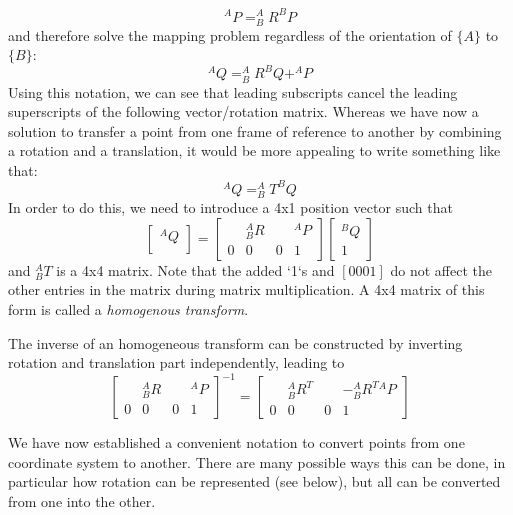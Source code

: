 \begin{equation}
^AP=^A_BR^BP
\end{equation}
%
and therefore solve the mapping problem regardless of the orientation of $\{A\}$ to $\{B\}$:
\begin{equation}
^AQ=^A_BR^BQ+^AP
\end{equation}
Using this notation, we can see that leading subscripts cancel the leading superscripts of the following vector/rotation matrix. Whereas we have now a solution to transfer a point from one frame of reference to another by combining a rotation and a translation, it would be more appealing to write something like that:
\begin{equation}
^AQ=^A_BT^BQ
\end{equation}
In order to do this, we need to introduce a 4x1 position vector such that
\begin{equation}
\left[\begin{array}{c}^AQ\\\end{array}\right]=\left[\begin{array}{ccc|c} & ^A_BR & & ^AP \\\hline 0 & 0 & 0 & 1\end{array}\right]\left[\begin{array}{c}^BQ\\1\end{array}\right]
\end{equation}
and $^A_BT$ is a 4x4 matrix.  Note that the added `1`s and $ [0 0 0 1]$ do not affect the other entries in the matrix during matrix multiplication. A 4x4 matrix of this form is called a \emph{homogenous transform}.

The inverse of an homogeneous transform can be constructed by inverting rotation and translation part independently, leading to
\begin{equation}
\left[\begin{array}{ccc|c} & ^A_BR & & ^AP \\\hline 0 & 0 & 0 & 1\end{array}\right]^{-1}=
\left[\begin{array}{ccc|c} & ^A_BR^T & & -^A_B{R^T}{^AP} \\\hline 0 & 0 & 0 & 1\end{array}\right]
\end{equation}

We have now established a convenient notation to convert points from one coordinate system to another. There are many possible ways this can be done, in particular how rotation can be represented (see below), but all can be converted from one into the other. 

